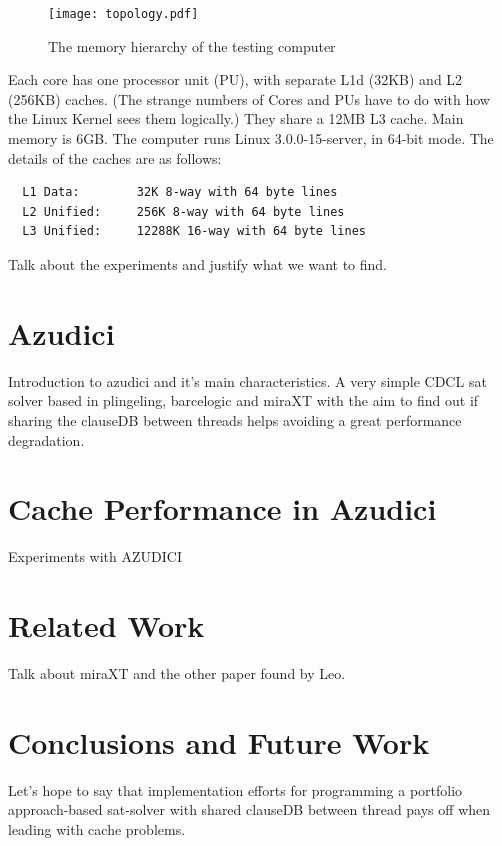 \documentclass{llncs}
\begin{document}
\begin{figure}[htp]
  \centering
  \texttt{[image: topology.pdf]}
  \caption{The memory hierarchy of the testing computer}
  \label{fig:topology}
\end{figure}

Each core has one processor unit (PU), with separate L1d (32KB) and L2
(256KB) caches. (The strange numbers of Cores and PUs have to do with
how the Linux Kernel sees them logically.) They share a 12MB L3
cache. Main memory is 6GB. The computer runs Linux 3.0.0-15-server, in
64-bit mode. The details of the caches are as follows:

\small
\begin{verbatim}
  L1 Data:        32K 8-way with 64 byte lines
  L2 Unified:     256K 8-way with 64 byte lines
  L3 Unified:     12288K 16-way with 64 byte lines
\end{verbatim}
\normalsize

Talk about the experiments and justify what we want to find.



\section{Azudici}
\label{sec:azudici}

Introduction to azudici and it's main characteristics. A very simple
CDCL sat solver based in plingeling, barcelogic and miraXT with the
aim to find out if sharing the clauseDB between threads helps avoiding
a great performance degradation.

\section{Cache Performance in Azudici}

Experiments with AZUDICI

\section{Related Work}

Talk about miraXT and the other paper found by Leo.

\section{Conclusions and Future Work}

Let's hope to say that implementation efforts for programming a
portfolio approach-based sat-solver with shared clauseDB between
thread pays off when leading with cache problems.
\end{document}

